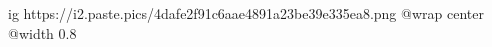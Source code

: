  
 
 
 
 

\ifcmt
	ig https://i2.paste.pics/4dafe2f91c6aae4891a23be39e335ea8.png
  @wrap center
  @width 0.8
\fi
